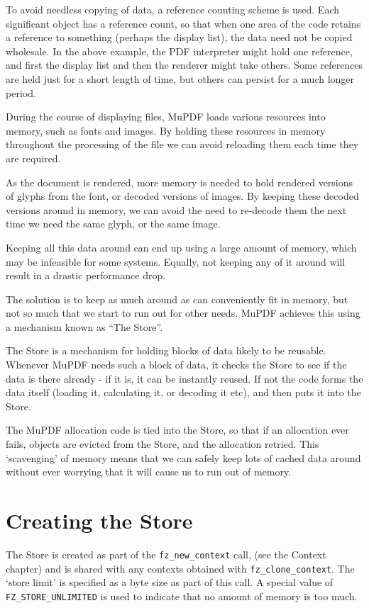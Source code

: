 \documentclass[oneside]{book}
\begin{document}
To avoid needless copying of data, a reference counting scheme is used. Each significant object has a reference count, so that when one area of the code retains a reference to something (perhaps the display list), the data need not be copied wholesale. In the above example, the PDF interpreter might hold one reference, and first the display list and then the renderer might take others. Some references are held just for a short length of time, but others can persist for a much longer period.

During the course of displaying files, MuPDF loads various resources into memory, such as fonts and images. By holding these resources in memory throughout the processing of the file we can avoid reloading them each time they are required.

As the document is rendered, more memory is needed to hold rendered versions of glyphs from the font, or decoded versions of images. By keeping these decoded versions around in memory, we can avoid the need to re-decode them the next time we need the same glyph, or the same image.

Keeping all this data around can end up using a large amount of memory, which may be infeasible for some systems. Equally, not keeping any of it around will result in a drastic performance drop.

The solution is to keep as much around as can conveniently fit in memory, but not so much that we start to run out for other needs. MuPDF achieves this using a mechanism known as ``The Store''.

The Store is a mechanism for holding blocks of data likely to be reusable. Whenever MuPDF needs such a block of data, it checks the Store to see if the data is there already - if it is, it can be instantly reused. If not the code forms the data itself (loading it, calculating it, or decoding it etc), and then puts it into the Store.

The MuPDF allocation code is tied into the Store, so that if an allocation ever fails, objects are evicted from the Store, and the allocation retried. This `scavenging' of memory means that we can safely keep lots of cached data around without ever worrying that it will cause us to run out of memory.

\section{Creating the Store}

The Store is created as part of the \texttt{fz\_new\_context} call, (see the Context chapter) and is shared with any contexts obtained with \texttt{fz\_clone\_context}. The `store limit' is specified as a byte size as part of this call. A special value of \texttt{FZ\_STORE\_UNLIMITED} is used to indicate that no amount of memory is too much.
\end{document}
